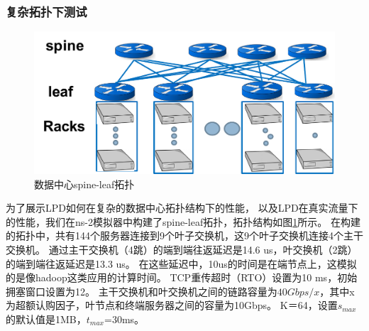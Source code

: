 \subsubsection{复杂拓扑下测试}
\begin{figure}[H] 
  \centering
  \includegraphics[width=0.8\columnwidth]{figures/LPD/spineleaf.pdf}
  \caption{数据中心spine-leaf拓扑}
\label{DataCenterspineleaf-fig}
\end{figure}

为了展示LPD如何在复杂的数据中心拓扑结构下的性能，
以及LPD在真实流量下的性能，我们在ns-2模拟器中构建了spine-leaf拓扑，拓扑结构如图\ref{DataCenterspineleaf-fig}所示。
在构建的拓扑中，共有144个服务器连接到9个叶子交换机，这9个叶子交换机连接4个主干交换机。
通过主干交换机（4跳）的端到端往返延迟是14.6 us，叶交换机（2跳）的端到端往返延迟是13.3 us。
在这些延迟中，10us的时间是在端节点上，这模拟的是像hadoop这类应用的计算时间。 
TCP重传超时（RTO）设置为10 ms，初始拥塞窗口设置为12。
主干交换机和叶交换机之间的链路容量为$40 Gbps / x$，其中x为超额认购因子，叶节点和终端服务器之间的容量为10Gbps。 
K＝64，设置$s_{max}$的默认值是1MB，$t_{max}$=30ms。


